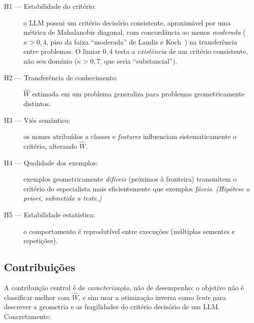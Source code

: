 \documentclass[12pt,a4paper]{article}
\newcommand{\West}{\ensuremath{\hat{W}}}   %
\begin{document}
\begin{description}
  \item[H1 — Estabilidade do critério:] o LLM possui um critério decisório consistente,
    aproximável por uma métrica de Mahalanobis diagonal, com concordância ao menos
    \emph{moderada} ($\kappa > 0{,}4$, piso da faixa ``moderada'' de Landis e
    Koch~\cite{landisKoch1977}) na transferência entre problemas. O limiar $0{,}4$ testa a
    \emph{existência} de um critério consistente, não seu domínio ($\kappa > 0{,}7$, que
    seria ``substancial'').
  \item[H2 — Transferência de conhecimento:] \West{} estimada em um problema generaliza
    para problemas geometricamente distintos.
  \item[H3 — Viés semântico:] os nomes atribuídos a classes e \emph{features} influenciam
    sistematicamente o critério, alterando \West{}.
  \item[H4 — Qualidade dos exemplos:] exemplos geometricamente \emph{difíceis} (próximos
    à fronteira) transmitem o critério do especialista mais eficientemente que exemplos
    \emph{fáceis}. \emph{(Hipótese a priori, submetida a teste.)}
  \item[H5 — Estabilidade estatística:] o comportamento é reprodutível entre execuções
    (múltiplas sementes e repetições).
\end{description}

\subsection*{Contribuições}

A contribuição central é de \emph{caracterização}, não de desempenho: o objetivo não é
classificar melhor com \West{}, e sim usar a otimização inversa como \emph{lente} para
descrever a geometria e as fragilidades do critério decisório de um LLM. Concretamente:
\end{document}
